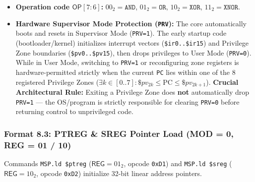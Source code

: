 \documentclass[11pt,a4paper]{article}
\newcommand{\reg}[1]{\texttt{#1}}
\newcommand{\field}[1]{\textsf{#1}}
\begin{document}
\begin{itemize}
  \item \textbf{Operation code $\field{OP} [7:6]$:} $00_2 = \texttt{AND}$, $01_2 = \texttt{OR}$, $10_2 = \texttt{XOR}$, $11_2 = \texttt{XNOR}$.
  \item \textbf{Hardware Supervisor Mode Protection (\texttt{PRV}):} The core automatically boots and resets in Supervisor Mode (\texttt{PRV=1}). The early startup code (bootloader/kernel) initializes interrupt vectors (\texttt{\$ir0..\$ir15}) and Privilege Zone boundaries (\texttt{\$pv0..\$pv15}), then drops privileges to User Mode (\texttt{PRV=0}). While in User Mode, switching to \texttt{PRV=1} or reconfiguring zone registers is hardware-permitted strictly when the current \reg{PC} lies within one of the 8 registered Privilege Zones ($\exists k \in [0..7]: \$pv_{2k} \le \text{PC} \le \$pv_{2k+1}$). \textbf{Crucial Architectural Rule:} Exiting a Privilege Zone does \textbf{not} automatically drop \texttt{PRV=1} --- the OS/program is strictly responsible for clearing \texttt{PRV=0} before returning control to unprivileged code.
\end{itemize}

\subsubsection{Format 8.3: PTREG \& SREG Pointer Load (MOD = 0, REG = 01 / 10)}
Commands \texttt{MSP.ld \$ptreg} ($\field{REG}=01_2$, opcode \texttt{0xD1}) and \texttt{MSP.ld \$sreg} ($\field{REG}=10_2$, opcode \texttt{0xD2}) initialize 32-bit linear address pointers.
\end{document}
